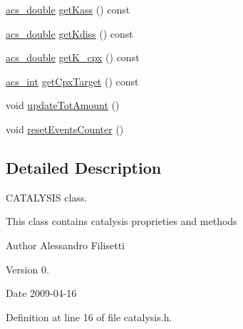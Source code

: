 \begin{DoxyCompactItemize}
\hyperlink{a00072_ab776853a005fcbf56af0424a2a4dd607}{acs\-\_\-double} \hyperlink{a00012_a471d98737d6708b3ac03efba41082d0c}{get\-Kass} () const 
\item 
\hyperlink{a00072_ab776853a005fcbf56af0424a2a4dd607}{acs\-\_\-double} \hyperlink{a00012_ad8b0d5f6410e2256cfefe0db9a10b0af}{get\-Kdiss} () const 
\item 
\hyperlink{a00072_ab776853a005fcbf56af0424a2a4dd607}{acs\-\_\-double} \hyperlink{a00012_a182bfb05b12ddd3613693f6d1f362665}{get\-K\-\_\-cpx} () const 
\item 
\hyperlink{a00072_a8d277355641a098190360234e2ebde35}{acs\-\_\-int} \hyperlink{a00012_a95cce06ac3f63b66d984bd723ab7e561}{get\-Cpx\-Target} () const 
\item 
void \hyperlink{a00012_a9c90e6f2cd9aafd2029ef20a09b95eb2}{update\-Tot\-Amount} ()
\item 
void \hyperlink{a00012_ab8964f8ec17d677de03747520d0a9995}{reset\-Events\-Counter} ()
\end{DoxyCompactItemize}


\subsection{Detailed Description}
C\-A\-T\-A\-L\-Y\-S\-I\-S class. 

This class contains catalysis proprieties and methods \begin{DoxyAuthor}{Author}
Alessandro Filisetti 
\end{DoxyAuthor}
\begin{DoxyVersion}{Version}
0. 
\end{DoxyVersion}
\begin{DoxyDate}{Date}
2009-\/04-\/16 
\end{DoxyDate}


Definition at line 16 of file catalysis.\-h.



